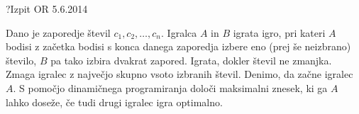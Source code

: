 \begin{naloga}{?}{Izpit OR 5.6.2014}
\begin{vprasanje}
Dano je zaporedje števil $c_1, c_2, \dots, c_n$.
Igralca $A$ in $B$ igrata igro,
pri kateri $A$ bodisi z začetka bodisi s konca danega zaporedja
izbere eno (prej še neizbrano) število,
$B$ pa tako izbira dvakrat zapored.
Igrata, dokler števil ne zmanjka.
Zmaga igralec z največjo skupno vsoto izbranih števil.
Denimo, da začne igralec $A$.
S pomočjo dinamičnega programiranja določi maksimalni znesek,
ki ga $A$ lahko doseže, če tudi drugi igralec igra optimalno.
\end{vprasanje}
\begin{odgovor}
\end{odgovor}
\end{naloga}
